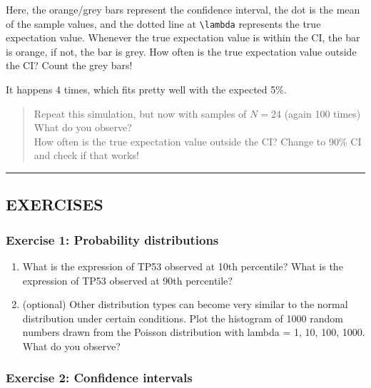 \documentclass[
]{book}
\begin{document}
Here, the orange/grey bars represent the confidence interval, the dot is the mean of the sample values, and the dotted line at \texttt{\textbackslash{}lambda} represents the true expectation value. Whenever the true expectation value is within the CI, the bar is orange, if not, the bar is grey. How often is the true expectation value outside the CI? Count the grey bars!

It happens 4 times, which fits pretty well with the expected 5\%.

\begin{quote}
Repeat this simulation, but now with samples of \(N=24\) (again 100 times)\\
What do you observe?\\
How often is the true expectation value outside the CI? Change to 90\% CI and check if that works!
\end{quote}

\begin{center}\rule{0.5\linewidth}{0.5pt}\end{center}

\hypertarget{exercises-2}{%
\subsection{EXERCISES}\label{exercises-2}}

\hypertarget{exercise-1-probability-distributions}{%
\subsubsection{Exercise 1: Probability distributions}\label{exercise-1-probability-distributions}}

\begin{enumerate}
\def\labelenumi{\arabic{enumi}.}
\item
  What is the expression of TP53 observed at 10th percentile? What is the expression of TP53 observed at 90th percentile?
\item
  (optional) Other distribution types can become very similar to the normal distribution under certain conditions. Plot the histogram of 1000 random numbers drawn from the Poisson distribution with lambda = 1, 10, 100, 1000. What do you observe?
\end{enumerate}

\hypertarget{exercise-2-confidence-intervals}{%
\subsubsection{Exercise 2: Confidence intervals}\label{exercise-2-confidence-intervals}}
\end{document}
